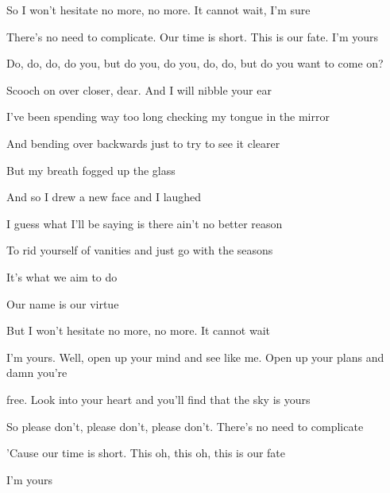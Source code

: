 \begin{song}
So I won't hesitate no more, no more. It cannot wait, I'm sure \par
There's no need to complicate. Our time is short. This is our fate. I'm yours \par

\bigskip

 Do, do, do, do you,  but do you, do you, do, do, but do you want to come on?  \par
Scooch on over closer, dear. And I will nibble your ear \par

\bigskip

      \par


\bigskip

I've been spending way too long checking my tongue in the mirror \par
And bending over backwards just to try to see it clearer \par
But my breath fogged up the glass \par
And so I drew a new face and I laughed \par
I guess what I'll be saying is there ain't no better reason \par
To rid yourself of vanities and just go with the seasons \par
It's what we aim to do \par
Our name is our virtue \par

\bigskip

But I won't hesitate no more, no more. It cannot wait \par

\bigskip

I'm yours. Well, open up your mind and see like me. Open up your plans and damn you're \par
{}free. Look into your heart and you'll find that  the sky is yours \par
So please don't, please don't, please don't. There's no need to complicate \par
'Cause our time is short. This oh, this oh, this is our fate \par
I'm yours \par

\end{song}